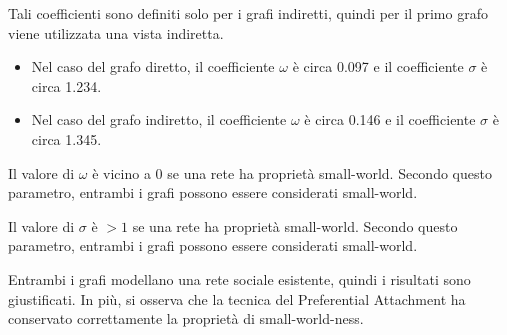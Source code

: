 \documentclass[a4paper, 11pt, twoside]{article}
\begin{document}
Tali coefficienti sono definiti solo per i grafi indiretti, quindi per il primo grafo viene utilizzata una vista indiretta.

\begin{itemize}
    \item Nel caso del grafo diretto, il coefficiente $\omega$ è circa 0.097 e il coefficiente $\sigma$ è circa 1.234.
    \item Nel caso del grafo indiretto, il coefficiente $\omega$ è circa 0.146 e il coefficiente $\sigma$ è circa 1.345.
\end{itemize}

Il valore di $\omega$ è vicino a 0 se una rete ha proprietà small-world. Secondo questo parametro, entrambi i grafi possono essere considerati small-world.

Il valore di $\sigma$ è $>1$ se una rete ha proprietà small-world. Secondo questo parametro, entrambi i grafi possono essere considerati small-world.

Entrambi i grafi modellano una rete sociale esistente, quindi i risultati sono giustificati. In più, si osserva che la tecnica del Preferential Attachment ha conservato correttamente la proprietà di small-world-ness.
\end{document}
